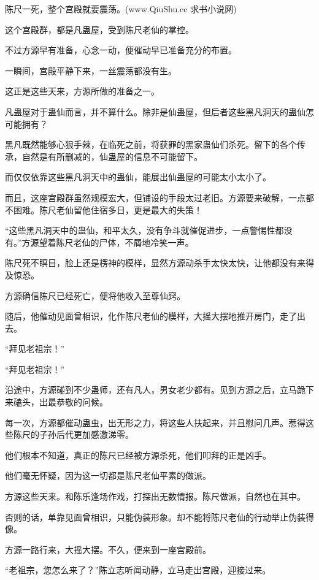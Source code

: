 
\begin{this_body}

陈尺一死，整个宫殿就要震荡。(www.QiuShu.cc 求书小说网)

这个宫殿群，都是凡蛊屋，受到陈尺老仙的掌控。

不过方源早有准备，心念一动，便催动早已准备充分的布置。

一瞬间，宫殿平静下来，一丝震荡都没有生。

这正是这些天来，方源所做的准备之一。

凡蛊屋对于蛊仙而言，并不算什么。除非是仙蛊屋，但后者这些黑凡洞天的蛊仙怎可能拥有？

黑凡既然能够心狠手辣，在临死之前，将获罪的黑家蛊仙们杀死。留下的各个传承，自然是有所删减的，仙蛊屋的信息不可能留下。

而仅仅依靠这些黑凡洞天中的蛊仙，能展出仙蛊屋的可能太小太小了。

而且，这座宫殿群虽然规模宏大，但铺设的手段太过老旧。方源要来破解，一点都不困难。陈尺老仙留他住宿多日，更是最大的失策！

“这些黑凡洞天中的蛊仙，和平太久，没有争斗就催促进步，一点警惕性都没有。”方源望着陈尺老仙的尸体，不屑地冷笑一声。

陈尺死不瞑目，脸上还是楞神的模样，显然方源动杀手太快太快，让他都没有来得及惊恐。

方源确信陈尺已经死亡，便将他收入至尊仙窍。

随后，他催动见面曾相识，化作陈尺老仙的模样，大摇大摆地推开房门，走了出去。

“拜见老祖宗！”

“拜见老祖宗！”

沿途中，方源碰到不少蛊师，还有凡人，男女老少都有。见到方源之后，立马跪下来磕头，出最恭敬的问候。

每一次，方源都催动蛊虫，出无形之力，将这些人扶起来，并且慰问几声。惹得这些陈尺的子孙后代更加感激涕零。

他们根本不知道，真正的陈尺已经被方源杀死，他们叩拜的正是凶手。

他们毫无怀疑，因为这一切都是陈尺老仙平素的做派。

方源这些天来。和陈乐逢场作戏，打探出无数情报。陈尺做派，自然也在其中。

否则的话，单靠见面曾相识，只能伪装形象。却不能将陈尺老仙的行动举止伪装得像。

方源一路行来，大摇大摆。不久，便来到一座宫殿前。

“老祖宗，您怎么来了？”陈立志听闻动静，立马走出宫殿，迎接过来。


\end{this_body}
